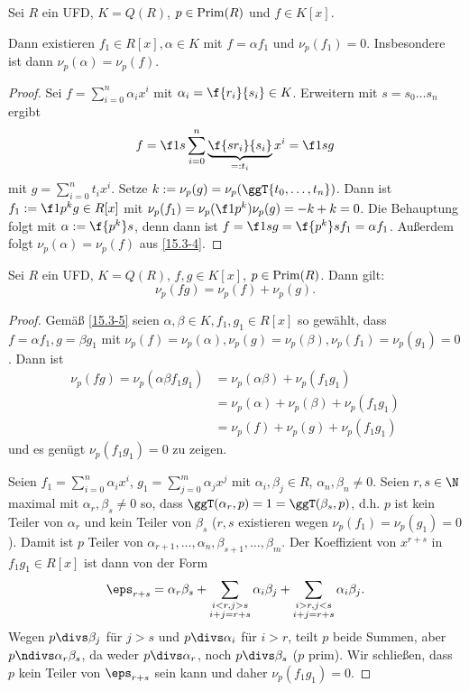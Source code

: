 \begin{kor} \label{15.3-5}
	Sei $R$ ein UFD, $K = Q(R)$, $p \in \operatorname{Prim}(R)$ und $f \in K[x]$.

	Dann existieren $f_1 \in R[x], \alpha \in K$ mit $f = \alpha f_1$ und $\nu_p(f_1) = 0$.
	Insbesondere ist dann $\nu_p(\alpha) = \nu_p(f)$.
	\begin{proof}
		Sei $f = \sum_{i=0}^n \alpha_i x^i$ mit $\alpha_i = \f{r_i}{s_i} \in K$.
		Erweitern mit $s = s_0 \dotsc s_n$ ergibt
		\[
			f = \f 1s \sum_{i=0}^n \underbrace{\f{sr_i}{s_i}}_{=:t_i} x^i = \f 1s g
		\]
		mit $g = \sum_{i=0}^n t_i x^i$.
		Setze $k := \nu_p(g) = \nu_p(\ggT\{t_0,\dotsc, t_n\})$.
		Dann ist $f_1 := \f 1{p^k} g \in R[x]$ mit $\nu_p(f_1) = \nu_p(\f 1{p^k}) \nu_p(g) = -k + k = 0$.
		Die Behauptung folgt mit $\alpha := \f {p^k}s$, denn dann ist $f = \f 1s g = \f {p^k}s f_1 = \alpha f_1$.
		Außerdem folgt $\nu_p(\alpha) = \nu_p(f)$ aus \ref{15.3-4}.
	\end{proof}
\end{kor}

\begin{lem} \label{15.3-6}
	Sei $R$ ein UFD, $K = Q(R)$, $f,g \in K[x]$, $p\in \operatorname{Prim}(R)$.
	Dann gilt:
	\[
		\nu_p(fg) = \nu_p(f) + \nu_p(g).
	\]
	\begin{proof}
		Gemäß \ref{15.3-5} seien $\alpha, \beta \in K, f_1, g_1 \in R[x]$ so gewählt, dass $f = \alpha f_1, g = \beta g_1$ mit $\nu_p(f) = \nu_p(\alpha), \nu_p(g) = \nu_p(\beta), \nu_p(f_1) = \nu_p(g_1) = 0$.
		Dann ist
		\begin{align*}
			\nu_p(fg)
			= \nu_p(\alpha \beta f_1 g_1)
			&= \nu_p(\alpha \beta) + \nu_p(f_1 g_1) \\
			&= \nu_p(\alpha) + \nu_p(\beta) + \nu_p(f_1g_1) \\
			&= \nu_p(f) + \nu_p(g) + \nu_p(f_1g_1)
		\end{align*}
		und es genügt $\nu_p(f_1g_1) = 0$ zu zeigen.

		Seien $f_1 = \sum_{i=0}^n \alpha_i x^i$, $g_1 = \sum_{j=0}^m \alpha_j x^j$ mit $\alpha_i, \beta_j \in R$, $\alpha_n, \beta_n \neq 0$.
		Seien $r, s \in \N$ maximal mit $\alpha_r, \beta_s \neq 0$ so, dass $\ggT(\alpha_r, p) = 1 = \ggT(\beta_s, p)$, d.h. $p$ ist kein Teiler von $\alpha_r$ und kein Teiler von $\beta_s$ ($r, s$ existieren wegen $\nu_p(f_1) = \nu_p(g_1) = 0$).
		Damit ist $p$ Teiler von $\alpha_{r+1}, \dotsc, \alpha_n, \beta_{s+1}, \dotsc, \beta_m$.
		Der Koeffizient von $x^{r+s}$ in $f_1g_1 \in R[x]$ ist dann von der Form
		\[
			\eps_{r + s}
			= \alpha_r\beta_s + \sum_{\substack{i < r, j > s \\ i + j = r + s}} \alpha_i \beta_j + \sum_{\substack{i > r, j < s \\ i + j = r + s}} \alpha_i \beta_j.
		\]
		Wegen $p \divs \beta_j$ für $j > s$ und $p \divs \alpha_i$ für $i > r$, teilt $p$ beide Summen, aber $p \ndivs \alpha_r \beta_s$, da weder $p \divs \alpha_r$, noch $p \divs \beta_s$ ($p$ prim).
		Wir schließen, dass $p$ kein Teiler von $\eps_{r+s}$ sein kann und daher $\nu_p(f_1g_1) = 0$.
	\end{proof}
\end{lem}

